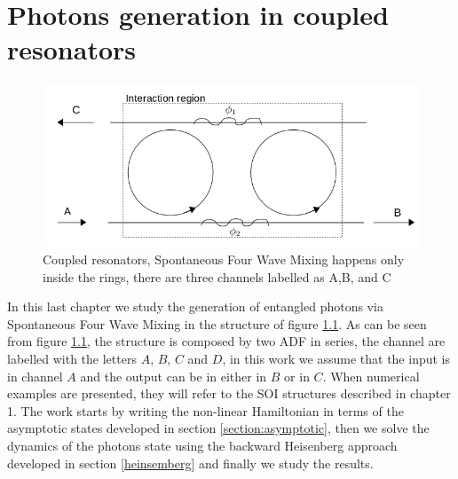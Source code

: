 \chapter{Photons generation in coupled resonators}
\begin{figure}[H]
\centering
\includegraphics[width = .8\textwidth]{img/system}
\caption{Coupled resonators, Spontaneous Four Wave Mixing happens only inside the rings, there are three channels labelled as A,B, and C}
\label{couplesstructure}
\end{figure}

In this last chapter we study the generation of entangled photons via Spontaneous Four Wave Mixing in the structure of figure \ref{couplesstructure}. As can be seen from figure \ref{couplesstructure}, the structure is composed by two ADF in series, the channel are labelled with the letters $A$, $B$, $C$ and $D$, in this work we assume that the input is in channel $A$ and the output can be in either in $B$ or in $C$. When numerical examples are presented, they will refer to the SOI structures described in chapter 1. The work starts by writing the non-linear Hamiltonian in terms of the asymptotic states developed in section \ref{section:asymptotic}, then we solve the dynamics of the photons state using the backward Heisenberg approach developed in section \ref{heinsemberg} and finally we study the results.

